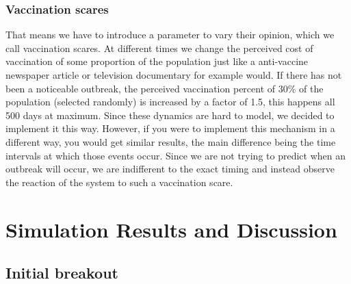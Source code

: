\documentclass[11pt]{article}
\begin{document}
\subsubsection{Vaccination scares}
That means we have to introduce a parameter to vary their opinion, which we call vaccination scares. At different times we change the perceived cost of vaccination of some proportion of the population just like a anti-vaccine newspaper article or television documentary for example would.
If there has not been a noticeable outbreak, the perceived vaccination percent of 30\% of the population (selected randomly) is increased by a factor of 1.5, this happens all 500 days at maximum. Since these dynamics are hard to model, we decided to implement it this way. However, if you were to implement this mechanism in a different way, you would get similar results, the main difference being the time intervals at which those events occur. Since we are not trying to predict when an outbreak will occur, we are indifferent to the exact timing and instead observe the reaction of the system to such a vaccination scare. 




\section{Simulation Results and Discussion}


\subsection{Initial breakout}
\end{document}
